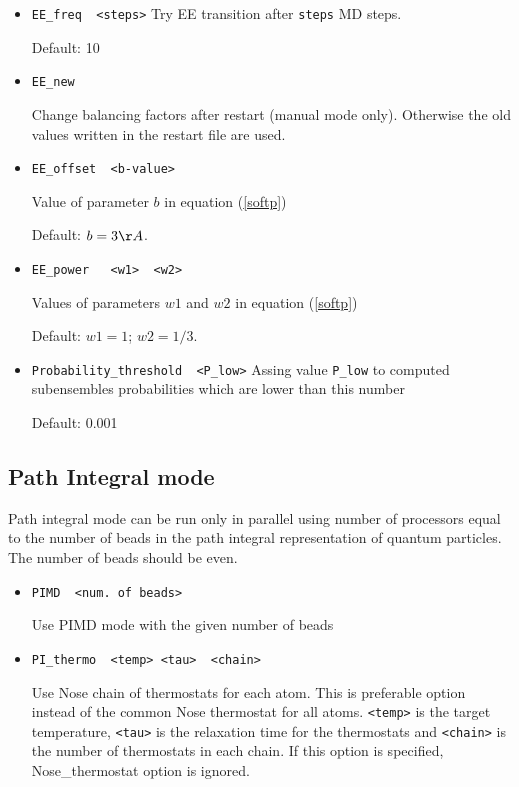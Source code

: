 \documentclass{article}
\begin{document}
\begin{itemize}
Start EE simulation in subensemble number \verb|<start_in>|.
Default: in the last subensemble (that is, with completely deleted 
EE molecule(s))

\item
\verb|EE_freq  <steps>|
Try EE transition after \verb|steps| MD steps.

Default: 10

\item
\verb|EE_new| 

Change balancing factors after restart (manual mode only). 
Otherwise the old values written in the restart file are used.

\item
\verb|EE_offset  <b-value>| 

Value of parameter $b$ in equation (\ref{softp})

Default:  $b = 3 \AA$.

\item
\verb|EE_power   <w1>  <w2>|

Values of parameters $w1$ and $w2$ in equation (\ref{softp})

Default:   $w1 = 1$;  $w2 = 1/3$.

\item
\verb|Probability_threshold  <P_low>|
Assing value \verb|P_low| to computed subensembles probabilities which
are lower than this number 

Default: 0.001

\end{itemize}


\subsection{Path Integral mode}

Path integral mode can be run only in parallel using number of processors equal 
to the number of beads in the path integral representation of quantum particles.
The number of beads should be even.

\begin{itemize}
\item
\verb|PIMD  <num. of beads>|

Use PIMD mode with the given number of beads

\item
\verb|PI_thermo  <temp> <tau>  <chain> |   

Use Nose chain of thermostats for each atom. This is preferable option instead
of the common Nose thermostat for all atoms. \verb|<temp>| is the target 
temperature, \verb|<tau>| is the relaxation time
for the thermostats and \verb|<chain>| is the number of thermostats in each
chain. If this  option is specified, Nose\_thermostat option is ignored.

\end{itemize}
\end{document}
